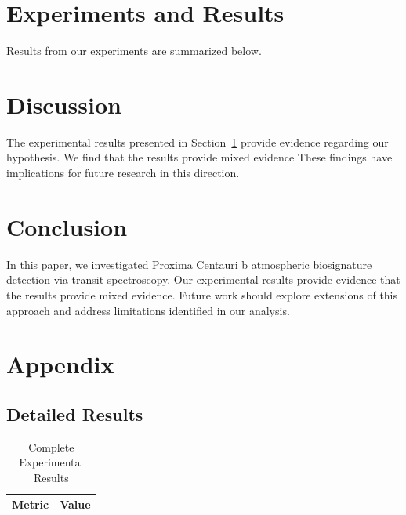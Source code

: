 \documentclass{article}
\begin{document}
\section{Experiments and Results}

\label{sec:results}

Results from our experiments are summarized below.

\section{Discussion}

The experimental results presented in Section~\ref{sec:results} provide evidence regarding our hypothesis. We find that the results provide mixed evidence These findings have implications for future research in this direction.

\section{Conclusion}

In this paper, we investigated Proxima Centauri b atmospheric biosignature detection via transit spectroscopy. Our experimental results provide evidence that the results provide mixed evidence. Future work should explore extensions of this approach and address limitations identified in our analysis.

\appendix

\section{Appendix}

\subsection{Detailed Results}

\begin{table}[htbp]
\centering
\caption{Complete Experimental Results}
\begin{tabular}{lc}
\toprule
Metric & Value \\
\midrule
\bottomrule
\end{tabular}
\end{table}




\end{document}
